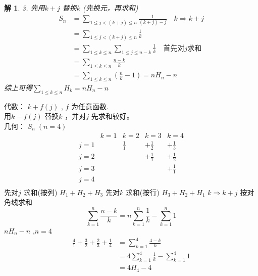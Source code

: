 \documentclass[mode=geye]{elegantnote}
\newtheorem{solve}{解}
\begin{document}
\begin{solve}
    3. 先用$ k+j $ 替换$ k $ (先换元，再求和)
    \begin{align*}
        S_n 
        &= \sum_{1\leqslant j < (k+j)\leqslant n}\frac{1}{(k+j)-j} \quad k\Rightarrow k+j \\
        &= \sum_{1\leqslant j < (k+j)\leqslant n}\frac{1}{k} \\
        &= \sum_{1\leqslant k \leqslant n} \sum_{1\leqslant j \leqslant n-k}\frac{1}{k} \quad\text{首先对}j\text{求和} \\
        &= \sum_{1\leqslant k \leqslant n} \frac{n-k}{k}\\
        &= \sum_{1\leqslant k \leqslant n} \left( \frac{n}{k}-1 \right) = n H_n - n
    \end{align*}
    综上可得$ \sum_{1\leqslant k\leqslant n}H_k = n H_n - n $ 
\end{solve}
代数：
$ k+f(j) $ , $ f $ 为任意函数.\\
用$ k-f(j) $ 替换$ k $ ，并对$ j $ 先求和较好。\\
几何：
$ S_n \;(n=4) $ 
\begin{equation*}
    \begin{array}{ccccc}
            & k=1   & k=2   & k=3   & k=4   \\
        j=1 & & \frac{1}{1} & +\frac{1}{2} & +\frac{1}{3} \\
        j=2 & &             & +\frac{1}{1} & +\frac{1}{2} \\
        j=3 & &             &              & +\frac{1}{1} \\
        j=4 & &             &              &              \\
    \end{array}
\end{equation*}
先对$ j $ 求和(按列) $ H_1 + H_2 + H_3 $ 
先对$ k $ 求和(按行) $ H_3 + H_2 + H_1 $ 
$ k\Rightarrow k+j $ 按对角线求和 
\begin{equation*}
    \sum_{k=1}^{n}\frac{n-k}{k} = n \sum_{k=1}^{n}\frac{1}{k}-\sum_{k=1}^{n} 1
\end{equation*}
$ nH_n-n $ ,$ n=4 $ 
\begin{align*}
    \frac{4}{1}+\frac{3}{2}+\frac{2}{3}+\frac{1}{4} &= \sum_{k=1}^{4}\frac{4-k}{k} \\ 
    &= 4\sum_{k=1}^{4}\frac{1}{k}-\sum_{k=1}^{4} 1 \\
    &= 4H_4 - 4
\end{align*}
\end{document}
